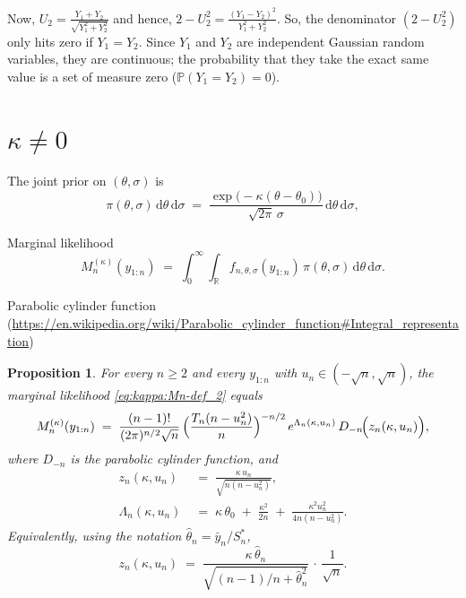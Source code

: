 \documentclass{article}%
\newtheorem{proposition}[theorem]{Proposition}
\begin{document}
Now, $U_2 = \frac{Y_1 + Y_2}{\sqrt{Y_1^2 + Y_2^2}}$ and hence, $2 - U_2^2 = \frac{(Y_1 - Y_2)^2}{Y_1^2 + Y_2^2}$. So, the denominator $(2 - U_2^2)$ only hits zero if $Y_1 = Y_2$. Since $Y_1$ and $Y_2$ are independent Gaussian random variables, they are continuous; the probability that they take the exact same value is a set of measure zero ($\mathbb{P}(Y_1 = Y_2) = 0$).


\section{$\kappa \neq 0$}

The joint prior on $(\theta, \sigma)$ is
\begin{equation}
  \pi(\theta, \sigma)\, \mathrm{d}\theta\, \mathrm{d}\sigma
  \;=\;
  \frac{\exp\!\bigl(-\kappa(\theta - \theta_0)\bigr)}{\sqrt{2\pi}\, \sigma}\,
  \mathrm{d}\theta\, \mathrm{d}\sigma,
\end{equation}


Marginal likelihood
\begin{equation}
  M_n^{(\kappa)}(y_{1:n})
  \;=\;
  \int_0^\infty\!\!\int_{\mathbb{R}}
  f_{n, \theta, \sigma}(y_{1:n})\, \pi(\theta, \sigma)\,
  \mathrm{d}\theta\, \mathrm{d}\sigma.
  \label{eq:kappa:Mn-def_2}
\end{equation}


Parabolic cylinder function
(\url{https://en.wikipedia.org/wiki/Parabolic_cylinder_function#Integral_representation})


\begin{proposition}
For every $n \geq 2$ and every $y_{1:n}$ with $u_n \in
(-\sqrt n, \sqrt n)$, the marginal likelihood
\eqref{eq:kappa:Mn-def_2} equals
\begin{equation}
  \;
  M_n^{(\kappa)}(y_{1:n})
  \;=\;
  \frac{(n - 1)!}{(2\pi)^{n/2}\sqrt{n}}\,
  \Bigl(\frac{T_n (n - u_n^2)}{n}\Bigr)^{-n/2}\,
  e^{\Lambda_n(\kappa, u_n)}\,
  D_{-n}\!\Bigl( z_n(\kappa, u_n) \Bigr),
  \;
  \label{eq:kappa:Mn-closed_2}
\end{equation}
where $D_{-n}$ is the parabolic cylinder function, and
\begin{align}
  z_n(\kappa, u_n)
  &\;=\;
  \frac{\kappa\, u_n}{\sqrt{n(n - u_n^2)}},
  \label{eq:kappa:zn_2}
  \\[0.3em]
  \Lambda_n(\kappa, u_n)
  &\;=\;
  \kappa\, \theta_0
  \;+\;
  \frac{\kappa^2}{2n}
  \;+\;
  \frac{\kappa^2 u_n^2}{4 n (n - u_n^2)}.
  \label{eq:kappa:Lambda_2}
\end{align}
Equivalently, using the notation $\hat\theta_n = \bar y_n / S_n^*$,
\[
  z_n(\kappa, u_n) \;=\;
  \frac{\kappa\, \hat\theta_n}{\sqrt{(n-1)/n + \hat\theta_n^2}}\,
  \cdot\, \frac{1}{\sqrt n}.
\]
\end{proposition}
\end{document}
